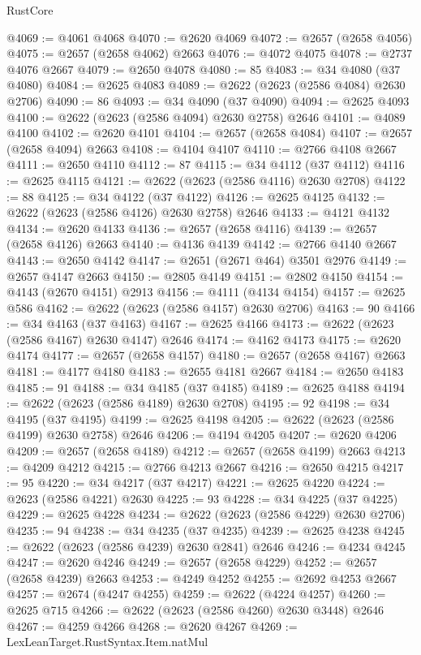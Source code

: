 \begin{lexlean}{RustCore}
\begin{coremodule}
@4069 := @4061 @4068
@4070 := @2620 @4069
@4072 := @2657 (@2658 @4056)
@4075 := @2657 (@2658 @4062) @2663
@4076 := @4072 @4075
@4078 := @2737 @4076 @2667
@4079 := @2650 @4078
@4080 := 85
@4083 := @34 @4080 (@37 @4080)
@4084 := @2625 @4083
@4089 := @2622 (@2623 (@2586 @4084) @2630 @2706)
@4090 := 86
@4093 := @34 @4090 (@37 @4090)
@4094 := @2625 @4093
@4100 := @2622 (@2623 (@2586 @4094) @2630 @2758) @2646
@4101 := @4089 @4100
@4102 := @2620 @4101
@4104 := @2657 (@2658 @4084)
@4107 := @2657 (@2658 @4094) @2663
@4108 := @4104 @4107
@4110 := @2766 @4108 @2667
@4111 := @2650 @4110
@4112 := 87
@4115 := @34 @4112 (@37 @4112)
@4116 := @2625 @4115
@4121 := @2622 (@2623 (@2586 @4116) @2630 @2708)
@4122 := 88
@4125 := @34 @4122 (@37 @4122)
@4126 := @2625 @4125
@4132 := @2622 (@2623 (@2586 @4126) @2630 @2758) @2646
@4133 := @4121 @4132
@4134 := @2620 @4133
@4136 := @2657 (@2658 @4116)
@4139 := @2657 (@2658 @4126) @2663
@4140 := @4136 @4139
@4142 := @2766 @4140 @2667
@4143 := @2650 @4142
@4147 := @2651 (@2671 @464) @3501 @2976
@4149 := @2657 @4147 @2663
@4150 := @2805 @4149
@4151 := @2802 @4150
@4154 := @4143 (@2670 @4151) @2913
@4156 := @4111 (@4134 @4154)
@4157 := @2625 @586
@4162 := @2622 (@2623 (@2586 @4157) @2630 @2706)
@4163 := 90
@4166 := @34 @4163 (@37 @4163)
@4167 := @2625 @4166
@4173 := @2622 (@2623 (@2586 @4167) @2630 @4147) @2646
@4174 := @4162 @4173
@4175 := @2620 @4174
@4177 := @2657 (@2658 @4157)
@4180 := @2657 (@2658 @4167) @2663
@4181 := @4177 @4180
@4183 := @2655 @4181 @2667
@4184 := @2650 @4183
@4185 := 91
@4188 := @34 @4185 (@37 @4185)
@4189 := @2625 @4188
@4194 := @2622 (@2623 (@2586 @4189) @2630 @2708)
@4195 := 92
@4198 := @34 @4195 (@37 @4195)
@4199 := @2625 @4198
@4205 := @2622 (@2623 (@2586 @4199) @2630 @2758) @2646
@4206 := @4194 @4205
@4207 := @2620 @4206
@4209 := @2657 (@2658 @4189)
@4212 := @2657 (@2658 @4199) @2663
@4213 := @4209 @4212
@4215 := @2766 @4213 @2667
@4216 := @2650 @4215
@4217 := 95
@4220 := @34 @4217 (@37 @4217)
@4221 := @2625 @4220
@4224 := @2623 (@2586 @4221) @2630
@4225 := 93
@4228 := @34 @4225 (@37 @4225)
@4229 := @2625 @4228
@4234 := @2622 (@2623 (@2586 @4229) @2630 @2706)
@4235 := 94
@4238 := @34 @4235 (@37 @4235)
@4239 := @2625 @4238
@4245 := @2622 (@2623 (@2586 @4239) @2630 @2841) @2646
@4246 := @4234 @4245
@4247 := @2620 @4246
@4249 := @2657 (@2658 @4229)
@4252 := @2657 (@2658 @4239) @2663
@4253 := @4249 @4252
@4255 := @2692 @4253 @2667
@4257 := @2674 (@4247 @4255)
@4259 := @2622 (@4224 @4257)
@4260 := @2625 @715
@4266 := @2622 (@2623 (@2586 @4260) @2630 @3448) @2646
@4267 := @4259 @4266
@4268 := @2620 @4267
@4269 := LexLeanTarget.RustSyntax.Item.natMul

\end{coremodule}
\end{lexlean}
